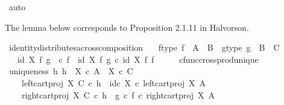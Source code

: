 \begin{isabellebody}
\ auto%
\endisatagproof
{\isafoldproof}%
%
\isadelimproof
%
\endisadelimproof
%
\begin{isamarkuptext}%
The lemma below corresponds to Proposition 2.1.11 in Halvorson.%
\end{isamarkuptext}\isamarkuptrue%
\isamarkupfalse%
\ identity{\isacharunderscore}{\kern0pt}distributes{\isacharunderscore}{\kern0pt}across{\isacharunderscore}{\kern0pt}composition{\isacharcolon}{\kern0pt}\isanewline
\ \ \ f{\isacharunderscore}{\kern0pt}type{\isacharcolon}{\kern0pt}\ {\isachardoublequoteopen}f\ {\isacharcolon}{\kern0pt}\ A\ {\isasymrightarrow}\ B{\isachardoublequoteclose}\ \ g{\isacharunderscore}{\kern0pt}type{\isacharcolon}{\kern0pt}\ {\isachardoublequoteopen}g\ {\isacharcolon}{\kern0pt}\ B\ {\isasymrightarrow}\ C{\isachardoublequoteclose}\isanewline
\ \ \ {\isachardoublequoteopen}id\ X\ {\isasymtimes}\isactrlsub f\ {\isacharparenleft}{\kern0pt}g\ \ {\isasymcirc}\isactrlsub c\ f{\isacharparenright}{\kern0pt}\ {\isacharequal}{\kern0pt}\ {\isacharparenleft}{\kern0pt}id\ X\ {\isasymtimes}\isactrlsub f\ g{\isacharparenright}{\kern0pt}\ {\isasymcirc}\isactrlsub c\ {\isacharparenleft}{\kern0pt}id\ X\ {\isasymtimes}\isactrlsub f\ f{\isacharparenright}{\kern0pt}{\isachardoublequoteclose}\isanewline
%
\isadelimproof
%
\endisadelimproof
%
\isatagproof
{}\isamarkupfalse%
\ {\isacharminus}{\kern0pt}\isanewline
\ \ \isamarkupfalse%
\ cfunc{\isacharunderscore}{\kern0pt}cross{\isacharunderscore}{\kern0pt}prod{\isacharunderscore}{\kern0pt}unique\isanewline
\ \ \isamarkupfalse%
\ uniqueness{\isacharcolon}{\kern0pt}\ {\isachardoublequoteopen}{\isasymforall}h{\isachardot}{\kern0pt}\ h\ {\isacharcolon}{\kern0pt}\ X\ {\isasymtimes}\isactrlsub c\ A\ {\isasymrightarrow}\ X\ {\isasymtimes}\isactrlsub c\ C\ {\isasymand}\isanewline
\ \ \ \ left{\isacharunderscore}{\kern0pt}cart{\isacharunderscore}{\kern0pt}proj\ X\ C\ {\isasymcirc}\isactrlsub c\ h\ {\isacharequal}{\kern0pt}\ id\isactrlsub c\ X\ {\isasymcirc}\isactrlsub c\ left{\isacharunderscore}{\kern0pt}cart{\isacharunderscore}{\kern0pt}proj\ X\ A\ {\isasymand}\isanewline
\ \ \ \ right{\isacharunderscore}{\kern0pt}cart{\isacharunderscore}{\kern0pt}proj\ X\ C\ {\isasymcirc}\isactrlsub c\ h\ {\isacharequal}{\kern0pt}\ {\isacharparenleft}{\kern0pt}g\ {\isasymcirc}\isactrlsub c\ f{\isacharparenright}{\kern0pt}\ {\isasymcirc}\isactrlsub c\ right{\isacharunderscore}{\kern0pt}cart{\isacharunderscore}{\kern0pt}proj\ X\ A\ {\isasymlongrightarrow}\isanewline

\end{isabellebody}
